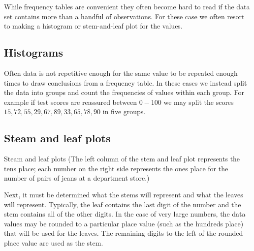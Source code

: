 While frequency tables are convenient they often become hard to read if the data set contains more than a handful of observations. For these case we often resort to making a histogram or stem-and-leaf plot for the values.

\subsection{Histograms}
Often data is not repetitive enough for the same value to be repeated enough times to draw conclusions from a frequency table. In these cases we instead split the data into groups and count the frequencies of values within each group. For example if test scores are reassured between $0-100$ we may split the scores $15, 72, 55, 29, 67, 89, 33, 65, 78, 90$ in five groups.
\begin{figure}[H]
\centering
{}
\end{figure}

\subsection{Steam and leaf plots}
Steam and leaf plots (The left column of the stem and leaf plot represents the tens place; each number on the right side represents the ones place for the number of pairs of jeans at a department store.)

Next, it must be determined what the stems will represent and what the leaves will represent. Typically, the leaf contains the last digit of the number and the stem contains all of the other digits. In the case of very large numbers, the data values may be rounded to a particular place value (such as the hundreds place) that will be used for the leaves. The remaining digits to the left of the rounded place value are used as the stem.

